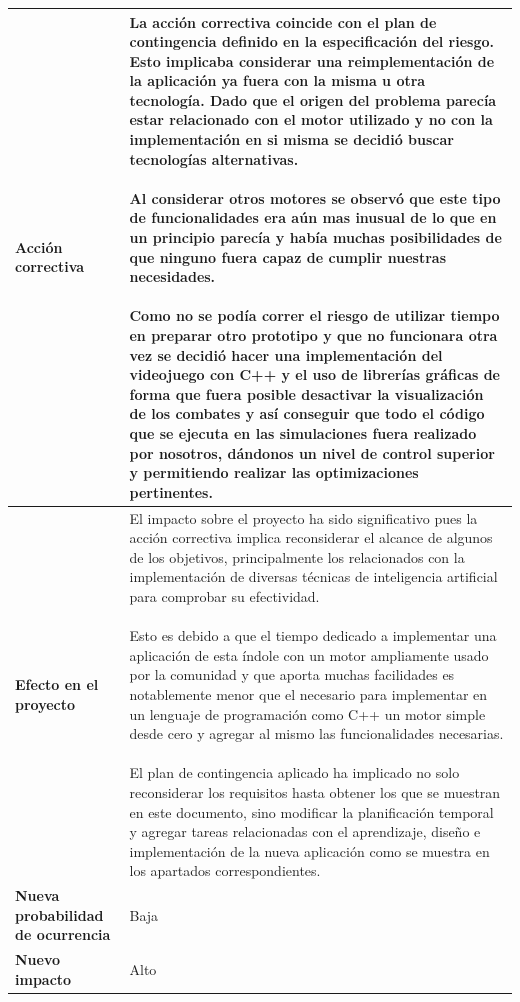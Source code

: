 \begin{center}
\begin{longtable}{ | p{5.6cm} | p{8.5cm} | }
		\hline
		\textbf{Acción correctiva} &
		\pbox{8.4cm}{ 
			La acción correctiva coincide con el plan de contingencia definido en la especificación del riesgo. Esto implicaba considerar una reimplementación de la aplicación ya fuera con la misma u otra tecnología. Dado que el origen del problema parecía estar relacionado con el motor utilizado y no con la implementación en si misma se decidió buscar tecnologías alternativas.\\\\Al considerar otros motores se observó que este tipo de funcionalidades era aún mas inusual de lo que en un principio parecía y había muchas posibilidades de que ninguno fuera capaz de cumplir nuestras necesidades.\\\\Como no se podía correr el riesgo de utilizar tiempo en preparar otro prototipo y que no funcionara otra vez se decidió hacer una implementación del videojuego con C++ y el uso de librerías gráficas de forma que fuera posible desactivar la visualización de los combates y así conseguir que todo el código que se ejecuta en las simulaciones fuera realizado por nosotros, dándonos un nivel de control superior y permitiendo realizar las optimizaciones pertinentes.
		}
		\\
		
		\hline
		\textbf{Efecto en el proyecto} &
		\pbox{8.4cm}{ 
			El impacto sobre el proyecto ha sido significativo pues la acción correctiva implica reconsiderar el alcance de algunos de los objetivos, principalmente los relacionados con la implementación de diversas técnicas de inteligencia artificial para comprobar su efectividad.\\\\Esto es debido a que el tiempo dedicado a implementar una aplicación de esta índole con un motor ampliamente usado por la comunidad y que aporta muchas facilidades es notablemente menor que el necesario para implementar en un lenguaje de programación como C++ un motor simple desde cero y agregar al mismo las funcionalidades necesarias.\\\\El plan de contingencia aplicado ha implicado no solo reconsiderar los requisitos hasta obtener los que se muestran en este documento, sino modificar la planificación temporal y agregar tareas relacionadas con el aprendizaje, diseño e implementación de la nueva aplicación como se muestra en los apartados correspondientes.
		}
		\\
		
		\hline 
		\textbf{Nueva probabilidad de \mbox{ocurrencia}} &
		Baja\\

		\hline 
		\textbf{Nuevo impacto} &
		Alto\\
		
		\hline
		

	\end{longtable}
\end{center}

